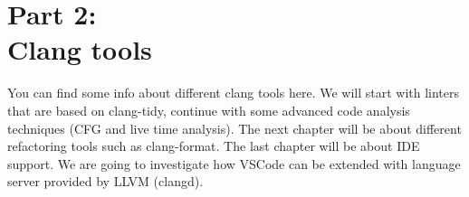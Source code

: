 \pagestyle{empty}
\pagecolor{Gray}
\color{black}

\chapter*{\textbf{Part 2:\\
    Clang tools}}

\begin{flushleft}

You can find some info about different clang tools here. We will start with
linters that are based on clang-tidy, continue with some advanced code analysis
techniques (CFG and live time analysis). The next chapter will be about
different refactoring tools such as clang-format. The last chapter will be about
IDE support. We are going to investigate how VSCode can be extended with
language server provided by LLVM (clangd).

\end{flushleft}

\clearpage

\nopagecolor





\clearpage
